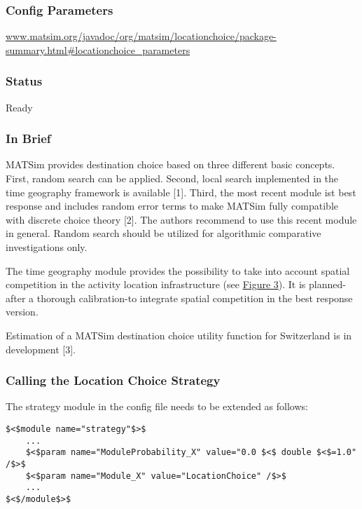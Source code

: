 \documentclass[a4paper,11pt]{report}
\begin{document}
\subsubsection{Config Parameters}


\href{http://www.matsim.org/javadoc/org/matsim/locationchoice/package-summary.html#locationchoice_parameters}{www.matsim.org/javadoc/org/matsim/locationchoice/package-summary.html\#locationchoice\_parameters}



\subsubsection{\textbf{Status}}

Ready

\subsubsection{\textbf{In Brief}}

MATSim provides destination choice based on three  different basic concepts. First, random search can be applied. Second,  local search implemented in the time geography framework is available  [1]. Third, the most recent module ist best response and includes random  error terms to make MATSim fully compatible with discrete choice theory  [2]. The authors recommend to use this recent module in general. Random  search should be utilized for algorithmic comparative investigations  only.

The time geography module provides the possibility to  take into account spatial competition in the activity location  infrastructure (see \hyperlink{Figure3}{Figure 3}). It is planned-after a thorough calibration-to integrate spatial competition in the best response version.

Estimation of a MATSim destination choice utility function for Switzerland is in development [3].




\subsubsection{\textbf{Calling the Location Choice Strategy}}

The strategy module in the config file needs to be extended as follows:
\begin{verbatim}
$<$module name="strategy"$>$
    ...
    $<$param name="ModuleProbability_X" value="0.0 $<$ double $<$=1.0" /$>$
    $<$param name="Module_X" value="LocationChoice" /$>$
    ...
$<$/module$>$
\end{verbatim}
\end{document}
